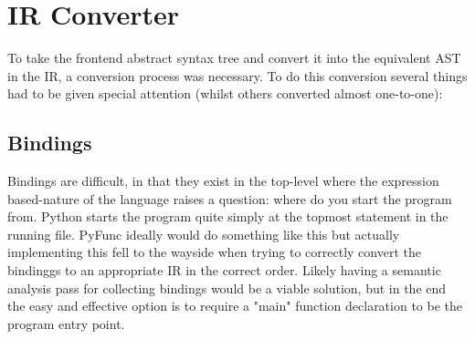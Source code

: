 \documentclass{l4proj}
\begin{document}











\section{IR Converter}

To take the frontend abstract syntax tree and convert it into the equivalent AST in the IR, a conversion process was necessary.
To do this conversion several things had to be given special attention (whilst others converted almost one-to-one):

\subsection{Bindings}
Bindings are difficult, in that they exist in the top-level where the expression based-nature of the language raises a question: where do you start the program from.
Python starts the program quite simply at the topmost statement in the running file.
PyFunc ideally would do something like this but actually implementing this fell to the wayside when trying to correctly convert the bindinggs to an appropriate IR in the correct order.
Likely having a semantic analysis pass for collecting bindings would be a viable solution, but in the end the easy and effective option is to require a "main" function declaration to be the program entry point.
\end{document}
